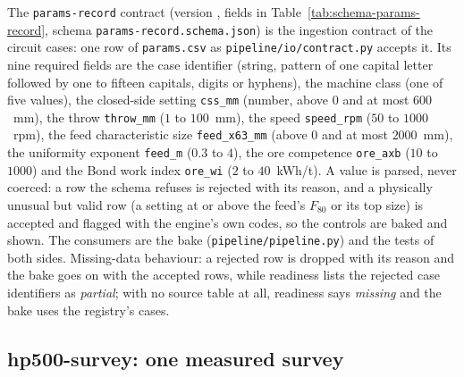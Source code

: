 The \texttt{params-record} contract (version , fields in Table~\ref{tab:schema-params-record}, schema \texttt{params-record.schema.json}) is the ingestion contract of
the circuit cases: one row of \texttt{params.csv} as \texttt{pipeline/\allowbreak{}io/\allowbreak{}contract.py} accepts it. Its nine required fields
are the case identifier (string, pattern of one capital letter followed by one to fifteen capitals, digits or hyphens), the
machine class (one of five values), the closed-side setting \texttt{css\_mm} (number, above $0$ and at most $600$~mm), the
throw \texttt{throw\_mm} ($1$ to $100$~mm), the speed \texttt{speed\_rpm} ($50$ to $1000$~rpm), the feed characteristic size
\texttt{feed\_x63\_mm} (above $0$ and at most $2000$~mm), the uniformity exponent \texttt{feed\_m} ($0.3$ to $4$), the ore
competence \texttt{ore\_axb} ($10$ to $1000$) and the Bond work index \texttt{ore\_wi} ($2$ to $40$~kWh/t). A value is parsed,
never coerced: a row the schema refuses is rejected with its reason, and a physically unusual but valid row (a setting at or
above the feed's $F_{80}$ or its top size) is accepted and flagged with the engine's own codes, so the controls are baked and
shown. The consumers are the bake (\texttt{pipeline/\allowbreak{}pipeline.py}) and the tests of both sides. Missing-data behaviour: a
rejected row is dropped with its reason and the bake goes on with the accepted rows, while readiness lists the rejected case
identifiers as \emph{partial}; with no source table at all, readiness says \emph{missing} and the bake uses the registry's
cases.

\subsection{hp500-survey: one measured survey}\label{sec:data-survey}


